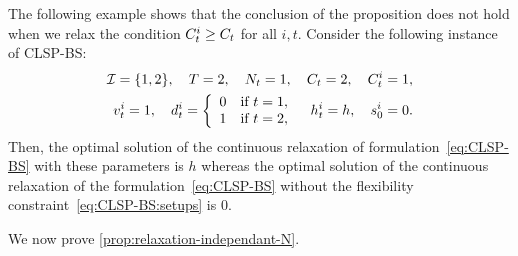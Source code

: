 The following example shows that the conclusion of the proposition does not hold when we relax the condition $C_t^i\ge C_t$ for all $i,t$. Consider the following instance of CLSP-BS:
\begin{equation}
\begin{split}
  \REF=\crbracket{1,2}
  ,\quad
  \horizon=2
  ,\quad
  \nbsetups_t=1
  ,\quad
  \capacity_t=2
  ,\quad
  \capacity_t^i=1
  ,
\\
  \rate_t^i=1
  ,\quad
  \demand_t^i
  =\left\{
  \begin{array}{ll}
  0 & \mbox{if}\ t=1,
  \\
  1 & \mbox{if}\ t=2,\end{array}
  \right.
  \quad
  \holding_t^i=\holding
  ,\quad
  \inventory_0^i=0.
\end{split}
\end{equation}
Then, the optimal solution of the continuous relaxation of formulation~\eqref{eq:CLSP-BS} with these parameters is $h$ whereas the optimal solution of the continuous relaxation of the formulation~\eqref{eq:CLSP-BS} without the flexibility constraint~\eqref{eq:CLSP-BS:setups} is 0.


We now prove \cref{prop:relaxation-independant-N}.

